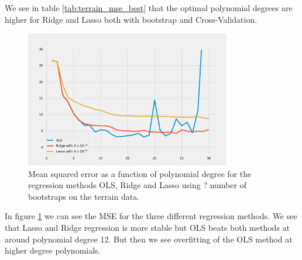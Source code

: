 We see in table \ref{tab:terrain_mse_best} that the optimal polynomial degrees are higher for Ridge and Lasso both with bootstrap and Cross-Validation.



\begin{figure}[H]
    \centering
	\label{fig:g_ols_ridge_lasso_boots}
	\caption{Mean squared error as a function of polynomial degree for the regression methods OLS, Ridge and Lasso using ? number of bootstraps on the terrain data.}
    \includegraphics[width=0.8\textwidth]{Figures/g_ols_ridge_lasso_boots_n_20.png}
\end{figure}

In figure \ref{fig:g_ols_ridge_lasso_boots} we can see the MSE for the three different regression methods. We see that Lasso and Ridge regression is more stable but OLS beats both methods at around polynomial degree 12. But then we see overfitting of the OLS method at higher degree polynomials.



